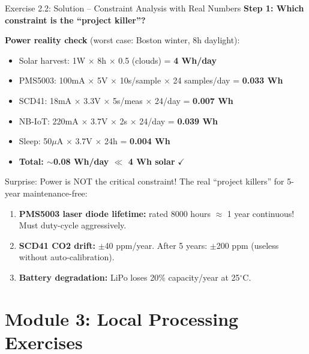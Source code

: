 \documentclass[aspectratio=169,11pt]{beamer}
\begin{document}
\begin{frame}{Exercise 2.2: Solution -- Constraint Analysis with Real Numbers}
    \textbf{Step 1: Which constraint is the ``project killer''?}
    
    \vspace{0.2cm}
    \textbf{Power reality check} (worst case: Boston winter, 8h daylight):
    \begin{itemize}
        \item Solar harvest: 1W $\times$ 8h $\times$ 0.5 (clouds) = \textbf{4 Wh/day}
        \item PMS5003: 100mA $\times$ 5V $\times$ 10s/sample $\times$ 24 samples/day = \textbf{0.033 Wh}
        \item SCD41: 18mA $\times$ 3.3V $\times$ 5s/meas $\times$ 24/day = \textbf{0.007 Wh}
        \item NB-IoT: 220mA $\times$ 3.7V $\times$ 2s $\times$ 24/day = \textbf{0.039 Wh}
        \item Sleep: 50$\mu$A $\times$ 3.7V $\times$ 24h = \textbf{0.004 Wh}
        \item \textbf{Total: $\sim$0.08 Wh/day $\ll$ 4 Wh solar} $\checkmark$
    \end{itemize}
    
    \vspace{0.2cm}
    \begin{alertblock}{Surprise: Power is NOT the critical constraint!}
        The real ``project killers'' for 5-year maintenance-free:
        \begin{enumerate}
            \item \textbf{PMS5003 laser diode lifetime:} rated 8000 hours $\approx$ 1 year continuous! Must duty-cycle aggressively.
            \item \textbf{SCD41 CO2 drift:} $\pm$40 ppm/year. After 5 years: $\pm$200 ppm (useless without auto-calibration).
            \item \textbf{Battery degradation:} LiPo loses 20\% capacity/year at 25$^\circ$C.
        \end{enumerate}
    \end{alertblock}
\end{frame}

\section{Module 3: Local Processing Exercises}
\end{document}
